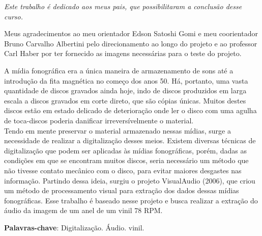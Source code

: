 \documentclass[
	12pt,				%
	openright,			%
	twoside,			%
	a4paper,			%
	english,			%
	french,				%
	spanish,			%
	brazil				%
	]{abntex2}
\begin{document}
\begin{dedicatoria}
   \vspace*{\fill}
   \centering
   \noindent
   \textit{ Este trabalho é dedicado aos meus pais, que possibilitaram a conclusão desse curso.} \vspace*{\fill}
\end{dedicatoria}

\begin{agradecimentos}

Meus agradecimentos ao meu orientador Edson Satoshi Gomi e meu coorientador Bruno Carvalho Albertini pelo direcionamento ao longo do projeto e ao professor Carl Haber por ter fornecido as imagens necessárias para o teste do projeto.

\end{agradecimentos}



\setlength{\absparsep}{18pt} %
\begin{resumo}
	A mídia fonográfica era a única maneira de armazenamento de sons até a introdução da fita magnética no começo dos anos 50. Há, portanto, uma vasta quantidade de discos gravados ainda hoje, indo de discos produzidos em larga escala a discos gravados em corte direto, que são cópias únicas. Muitos destes discos estão em estado delicado de deterioração onde ler o disco com uma agulha de toca-discos poderia danificar irreversívelmente o material. \\
	Tendo em mente preservar o material armazenado nessas mídias, surge a necessidade de realizar a digitalização desses meios. Existem diversas técnicas de digitalização que podem ser aplicadas às mídias fonográficas, porém, dadas as condições em que se encontram muitos discos, seria necessário um método que não tivesse contato mecânico com o disco, para evitar maiores desgastes nas informação. Partindo dessa ideia, surgiu o projeto VisualAudio (2006), que criou um método de processamento visual para extração dos dados dessas mídias fonográficas. Esse trabalho é baseado nesse projeto e busca realizar a extração do áudio da imagem de um anel de um vinil 78 RPM.

 \textbf{Palavras-chave}: Digitalização. Áudio. vinil.
\end{resumo}
\end{document}
